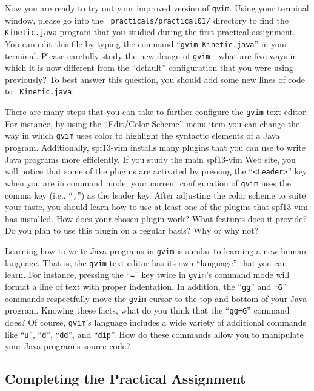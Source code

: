Now you are ready to try out your improved version of {\tt gvim}.  Using your terminal window, please go into the {\tt
  practicals/practical01/} directory to find the {\tt Kinetic.java} program that you studied during the first practical
assignment. You can edit this file by typing the command ``{\tt gvim Kinetic.java}'' in your terminal. Please carefully
study the new design of {\tt gvim}---what are five ways in which it is now different from the ``default'' configuration
that you were using previously? To best answer this question, you should add some new lines of code to {\tt
  Kinetic.java}.

There are many steps that you can take to further configure the {\tt gvim} text editor.  For instance, by using the
``Edit/Color Scheme'' menu item you can change the way in which {\tt gvim} uses color to highlight the syntactic
elements of a Java program. Additionally, spf13-vim installs many plugins that you can use to write Java programs more
efficiently.  If you study the main spf13-vim Web site, you will notice that some of the plugins are activated by
pressing the ``{\tt <Leader>}'' key when you are in command mode; your current configuration of {\tt gvim} uses the
comma key (i.e., ``{\tt ,}'') as the leader key. After adjusting the color scheme to suite your taste, you should learn
how to use at least one of the plugins that spf13-vim has installed.  How does your chosen plugin work?  What features
does it provide? Do you plan to use this plugin on a regular basis? Why or why not?

Learning how to write Java programs in {\tt gvim} is similar to learning a new human language.  That is, the {\tt gvim}
text editor has its own ``language'' that you can learn.  For instance, pressing the ``{\tt =}'' key twice in {\tt gvim}'s
command mode will format a line of text with proper indentation.  In addition, the ``{\tt gg}'' and ``{\tt G}'' commands
respectfully move the {\tt gvim} cursor to the top and bottom of your Java program.  Knowing these facts, what do you
think that the ``{\tt gg=G}'' command does? Of course, {\tt gvim}'s language includes a wide variety of additional
commands like ``{\tt u}'', ``{\tt d}'', ``{\tt dd}'', and ``{\tt dip}''.  How do these commands allow you to manipulate
your Java program's source code?

\vspace*{-.15in}
\subsection*{Completing the Practical Assignment}
\vspace*{-.1in}

